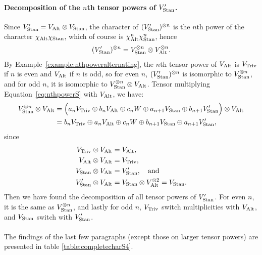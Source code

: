 {\begin{example}
	\paragraph{Decomposition of the $n$th tensor powers of $V'_{\text{Stan}}$.} Since $V'_{\text{Stan}} = V_{\text{Alt}} \otimes V_{\text{Stan}}$, the character of $(V'_{\text{Stan}})^{\otimes n}$ is the $n$th power of the character $\chi_{\text{Alt}} \chi_{\text{Stan}}$, which of course is $\chi_{\text{Alt}}^n\chi_{\text{Stan}}^n$, hence%
	\begin{align*}
		(V'_{\text{Stan}})^{\otimes n} = V_{\text{Stan}}^{\otimes n} \otimes V_{\text{Alt}}^{\otimes n}.
	\end{align*}
	By Example~\ref{example:nthpoweralternating}, the $n$th tensor power of $V_{\text{Alt}}$ is $V_{\text{Triv}}$ if $n$ is even and $V_{\text{Alt}}$ if $n$ is odd, so for even $n$, $(V'_{\text{Stan}})^{\otimes n}$ is isomorphic to $V_{\text{Stan}}^{\otimes n}$, and for odd $n$, it is isomorphic to $ V_{\text{Stan}}^{\otimes n} \otimes V_{\text{Alt}}$. Tensor multiplying Equation~\ref{eq:nthpowerS} with $V_{\text{Alt}}$, we have:
	\begin{align*}
		V_{\text{Stan}}^{\otimes n} \otimes V_{\text{Alt}} &= \Big(a_n V_{\text{Triv}} \oplus b_n V_{\text{Alt}} \oplus c_n W \oplus a_{n+1} V_{\text{Stan}} \oplus b_{n+1} V'_{\text{Stan}}\Big)\otimes V_{\text{Alt}} \\
		&= b_n V_{\text{Triv}} \oplus a_n V_{\text{Alt}} \oplus c_n W \oplus b_{n+1} V_{\text{Stan}} \oplus a_{n+1} V'_{\text{Stan}},
	\end{align*}
	since 
	\begin{align*}
		V_{\text{Triv}} \otimes V_{\text{Alt}} &= V_{\text{Alt}}, \\
		V_{\text{Alt}} \otimes V_{\text{Alt}} &= V_{\text{Triv}}, \\
		V_{\text{Stan}} \otimes V_{\text{Alt}} &= V'_{\text{Stan}}, \quad \text{and} \\
		V'_{\text{Stan}} \otimes V_{\text{Alt}} &= V_{\text{Stan}} \otimes V_{\text{Alt}}^{\otimes 2} = V_{\text{Stan}}.
	\end{align*}
	Then we have found the decomposition of all tensor powers of $V'_{\text{Stan}}$. For even $n$, it is the same as $V_{\text{Stan}}^{\otimes n}$, and lastly for odd $n$, $V_{\text{Triv}}$ switch multiplicities with $V_{\text{Alt}}$, and $V_{\text{Stan}}$ switch with $V'_{\text{Stan}}$.
	
	\paragraph{} The findings of the last few paragraphs (except those on larger tensor powers) are presented in table \ref{table:completecharS4}.
	

\end{example}}
